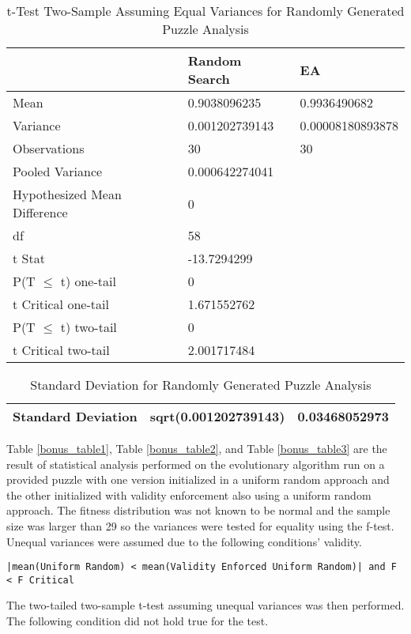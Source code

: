 \documentclass[11pt]{article}
\begin{document}
\begin{table}[H]
\centering
\caption{t-Test Two-Sample Assuming Equal Variances for Randomly Generated Puzzle Analysis}
\label{my-label}
\begin{tabular}{l|l|l}
 & Random Search & EA \\ \hline
Mean & 0.9038096235 & 0.9936490682 \\
Variance & 0.001202739143 & 0.00008180893878 \\
Observations & 30 & 30 \\
Pooled Variance & 0.000642274041 &  \\
Hypothesized Mean Difference & 0 &  \\
df & 58 &  \\
t Stat & -13.7294299 &  \\
P(T $\leq$ t) one-tail & 0 &  \\
t Critical one-tail & 1.671552762 &  \\
P(T $\leq$ t) two-tail & 0 &  \\
t Critical two-tail & 2.001717484 &
\end{tabular}
\end{table}

\begin{table}[H]
\centering
\caption{Standard Deviation for Randomly Generated Puzzle Analysis}
\label{my-label}
\begin{tabular}{|l|l|l|}
\hline
Standard Deviation & sqrt(0.001202739143) & 0.03468052973 \\ \hline
\end{tabular}
\end{table}


Table \ref{bonus_table1}, Table \ref{bonus_table2}, and Table \ref{bonus_table3} are the result of statistical analysis performed on the 
evolutionary algorithm run on a provided puzzle with one version initialized in a 
uniform random approach and the other initialized with validity enforcement also using 
a uniform random approach. The fitness distribution was not known to be normal 
and the sample size was larger than 29 so the variances were tested for 
equality using the f-test. Unequal variances were assumed due to the following 
conditions' validity.

\begin{center}
\texttt{|mean(Uniform Random) < mean(Validity Enforced Uniform Random)| and F < F Critical}
\end{center}

The two-tailed two-sample t-test assuming unequal variances was then performed. The following condition did not hold true for the test.
\end{document}
